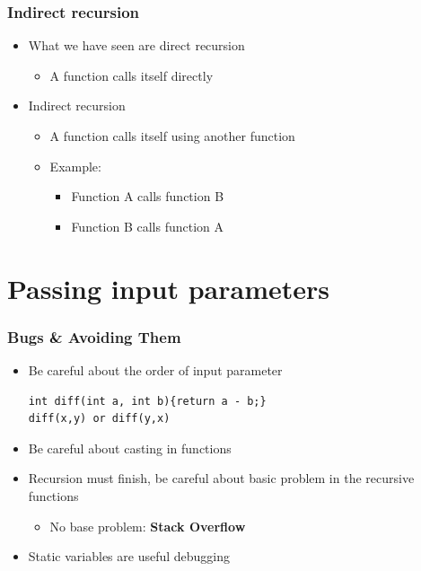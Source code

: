 \documentclass{../c-lecture}
\begin{document}
\begin{frame}
  \frametitle{Indirect recursion}
  \begin{itemize}
    \item What we have seen are direct recursion
    \begin{itemize}
      \item A function calls itself directly
    \end{itemize}
    \item Indirect recursion
    \begin{itemize}
      \item A function calls itself using another function
      \item Example:
      \begin{itemize}
        \item Function A calls function B
        \item Function B calls function A
      \end{itemize}
    \end{itemize}
  \end{itemize}
\end{frame}

\section{Passing input parameters}

\begin{frame}[fragile]
  \frametitle{Bugs \& Avoiding Them}
  \begin{itemize}
    \item Be careful about the order of input parameter
    \begin{verbatim}
int diff(int a, int b){return a - b;}
diff(x,y) or diff(y,x)
    \end{verbatim}
    \item Be careful about casting in functions
    \item
      Recursion must finish, be careful about basic problem in the recursive
      functions
    \begin{itemize}
      \item
        No base problem: \textbf{\color{YellowOrange} Stack Overflow}
    \end{itemize}
    \item Static variables are useful debugging
  \end{itemize}
\end{frame}
\end{document}

